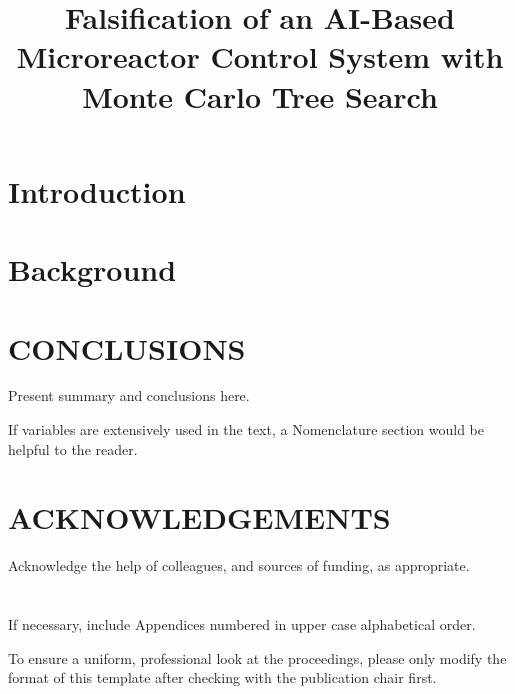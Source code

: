 \documentclass[]{ANStopical}
\title{Falsification of an AI-Based Microreactor Control System with Monte Carlo Tree Search}
\begin{document}
\section{Introduction}\label{sec:1}


 
\section{Background} \label{sec:2}


\section{CONCLUSIONS}
Present summary and conclusions here.

\printnomenclature 
If variables are extensively used in the text, a Nomenclature section would be helpful to the reader.


\section*{ACKNOWLEDGEMENTS}
Acknowledge the help of colleagues, and sources of funding, as appropriate.





\appendix

\section{}
If necessary, include Appendices numbered in upper case alphabetical order.

To ensure a uniform, professional look at the proceedings, please only modify the format of this template after checking with the publication chair first.
\end{document}
